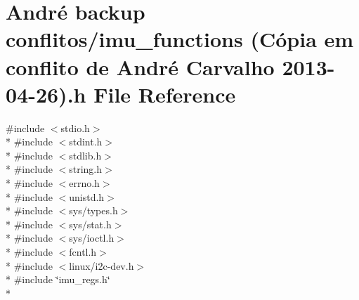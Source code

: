 \hypertarget{imu__functions_01_07C_xC3_xB3pia_01em_01conflito_01de_01Andr_xC3_xA9_01Carvalho_012013-04-26_08_8h}{\section{André backup conflitos/imu\-\_\-functions (Cópia em conflito de André Carvalho 2013-\/04-\/26).h File Reference}
\label{imu__functions_01_07C_xC3_xB3pia_01em_01conflito_01de_01Andr_xC3_xA9_01Carvalho_012013-04-26_08_8h}
}
{\ttfamily \#include $<$stdio.\-h$>$}\\*
{\ttfamily \#include $<$stdint.\-h$>$}\\*
{\ttfamily \#include $<$stdlib.\-h$>$}\\*
{\ttfamily \#include $<$string.\-h$>$}\\*
{\ttfamily \#include $<$errno.\-h$>$}\\*
{\ttfamily \#include $<$unistd.\-h$>$}\\*
{\ttfamily \#include $<$sys/types.\-h$>$}\\*
{\ttfamily \#include $<$sys/stat.\-h$>$}\\*
{\ttfamily \#include $<$sys/ioctl.\-h$>$}\\*
{\ttfamily \#include $<$fcntl.\-h$>$}\\*
{\ttfamily \#include $<$linux/i2c-\/dev.\-h$>$}\\*
{\ttfamily \#include \char`\"{}imu\-\_\-regs.\-h\char`\"{}}\\*
